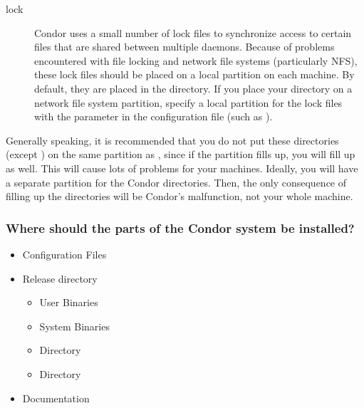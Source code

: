 \begin{description}
\item[lock] Condor uses a small number of lock files to synchronize
access to certain files that are shared between multiple daemons.
Because of problems encountered with file locking and network
file systems (particularly NFS), these lock files should be placed on a
local partition on each machine.  By default, they are placed in
the  directory.  If you place your 
directory on a network
file system partition, specify a local partition for the
lock files with the  parameter in the configuration file (such as
).

\end{description}

Generally speaking, it is recommended that you do not put these directories
(except ) on the same partition as ,
since if the partition
fills up, you will fill up  as well. 
This will cause lots of
problems for your machines.  Ideally, you will have a separate partition
for the Condor directories. Then, the only consequence of filling up
the directories
will be Condor's malfunction, not your whole machine.

\subsubsection{Where should the parts of the Condor system be
installed?} 

	\begin{itemize}
	\item Configuration Files
	\item Release directory
		\begin{itemize}
		\item User Binaries
		\item System Binaries 
		\item {} Directory
	  	\item {} Directory
		\end{itemize}
	\item Documentation
	\end{itemize}

